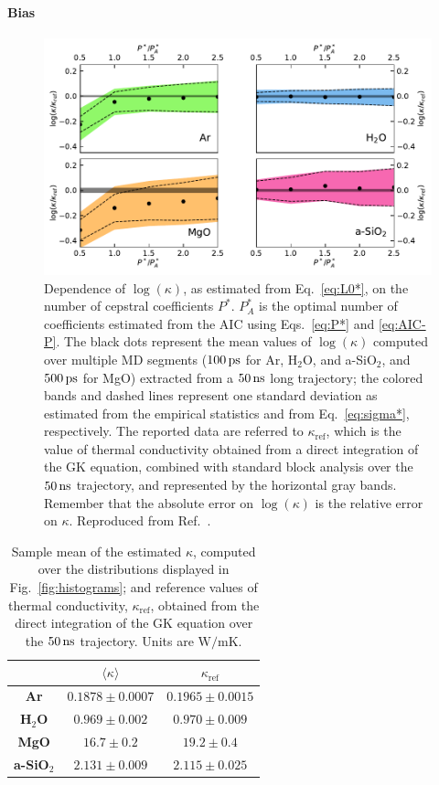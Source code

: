 \paragraph{Bias}
\begin{figure}[!tb]
    \centering
    \includegraphics[width=\textwidth]{chapters/chapter5/figures/L-vs-P.pdf}
    \caption{Dependence of $\log(\kappa)$, as estimated from Eq.~\eqref{eq:L0*}, on the number of cepstral coefficients $P^*$. $P_A^*$ is the optimal number of coefficients estimated from the AIC using Eqs.~\eqref{eq:P*} and \eqref{eq:AIC-P}. The black dots represent the mean values of $\log(\kappa)$ computed over multiple MD segments ($100\,\mathrm{ps}$ for Ar, H$_2$O, and a-SiO$_2$, and $500\,\mathrm{ps}$ for MgO) extracted from a $50\,\mathrm{ns}$ long trajectory; the colored bands and dashed lines represent one standard deviation as estimated from the empirical statistics and from Eq.~\eqref{eq:sigma*}, respectively. The reported data are referred to $\kappa_{\mathrm{ref}}$, which is the value of thermal conductivity obtained from a direct integration of the GK equation, combined with standard block analysis over the $50\,\mathrm{ns}$ trajectory, and represented by the horizontal gray bands. Remember that the absolute error on $\log(\kappa)$ is the relative error on $\kappa$. Reproduced from Ref.~\cite{Ercole2017}.
    }
    \label{fig:L-vs-P}
\end{figure}
\begin{table}[!tb]
    \centering
    \begin{tabular}{ccc}
                  & $\langle\kappa\rangle$ & $\kappa_\mathrm{ref}$ \\
        \hline
        \textbf{Ar}        & $0.1878 \pm 0.0007$ & $0.1965 \pm 0.0015$ \\
        \textbf{H$_2$O}    & $0.969 \pm 0.002$   & $0.970 \pm 0.009$ \\
        \textbf{MgO}       & $16.7 \pm 0.2$      & $19.2 \pm 0.4$ \\
        \textbf{a-SiO$_2$} & $2.131 \pm 0.009$   & $2.115 \pm 0.025$ \\
    \end{tabular}
    \caption{Sample mean of the estimated $\kappa$, computed over the distributions displayed in Fig.~\ref{fig:histograms}; and reference values of thermal conductivity, $\kappa_\mathrm{ref}$, obtained from the direct integration of the GK equation over the $50\,\mathrm{ns}$ trajectory. Units are $\mathrm{W/mK}$.}
    \label{tab:kappa-bias}
\end{table}
